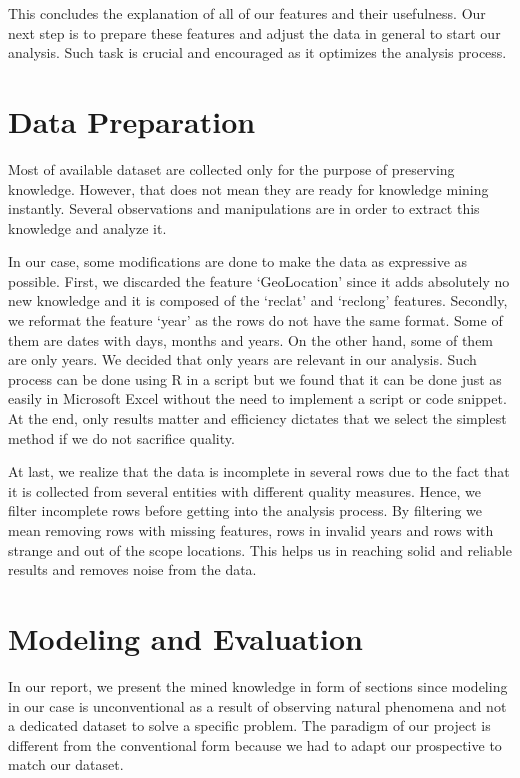 This concludes the explanation of all of our features and their usefulness. Our next step is to prepare these features and adjust the data in general to start our analysis. Such task is crucial and encouraged as it optimizes the analysis process.


\section{Data Preparation}
Most of available dataset are collected only for the purpose of preserving knowledge. However, that does not mean they are ready for knowledge mining instantly. Several observations and manipulations are in order to extract this knowledge and analyze it. 

In our case, some modifications are done to make the data as expressive as possible. First, we discarded the feature `GeoLocation' since it adds absolutely no new knowledge and it is composed of the `reclat' and `reclong' features. Secondly, we reformat the feature `year' as the rows do not have the same format. Some of them are dates with days, months and years. On the other hand, some of them are only years. We decided that only years are relevant in our analysis. Such process can be done using R in a script but we found that it can be done just as easily in Microsoft Excel without the need to implement a script or code snippet. At the end, only results matter and efficiency dictates that we select the simplest method if we do not sacrifice quality.

At last, we realize that the data is incomplete in several rows due to the fact that it is collected from several entities with different quality measures. Hence, we filter incomplete rows before getting into the analysis process. By filtering we mean removing rows with missing features, rows in invalid years and rows with strange and out of the scope locations. This helps us in reaching solid and reliable results and removes noise from the data.

\section{Modeling and Evaluation}
In our report, we present the mined knowledge in form of sections since modeling in our case is unconventional as a result of observing natural phenomena and not a dedicated dataset to solve a specific problem. The paradigm of our project is different from the conventional form because we had to adapt our prospective to match our dataset.

